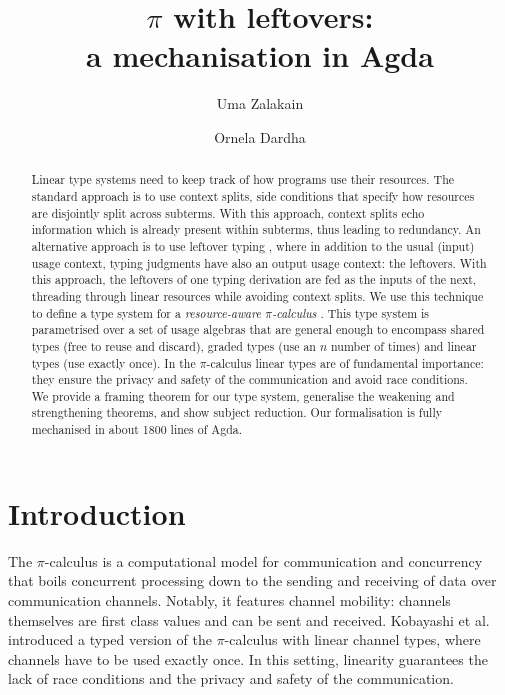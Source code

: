 \documentclass[]{llncs}
\title{$\pi$ with leftovers: \\ a mechanisation in Agda}
\author{
  Uma Zalakain\inst{1}\orcidID{0000-0002-3268-9338}
  \and
  Ornela Dardha\inst{2}\orcidID{0000-0001-9927-7875}
}
\institute{
  University of Glasgow, Scotland \\ \email{u.zalakain.1@research.gla.ac.uk}
  \and
  University of Glasgow, Scotland \\ \email{ornela.dardha@glasgow.ac.uk}
}
\newcommand{\picalc}{$\pi$-calculus}
\begin{document}
\maketitle

\begin{abstract}
  Linear type systems need to keep track of how programs use their resources.
  The standard approach is to use context splits, side conditions that specify how resources are disjointly split across subterms.
  With this approach, context splits echo information which is already present within subterms, thus leading to redundancy.  An alternative approach is to use leftover typing \cite{Mackie,Allais2018a}, where in addition to the usual (input) usage context, typing judgments have also an output usage context: the leftovers.
  With this approach, the leftovers of one typing derivation are fed as the inputs of the next, threading through linear resources while avoiding context splits.
  We use this technique to define a type system for a \emph{resource-aware \picalc{}} \cite{MilnerPW92,Milner99}.
  This type system is parametrised over a set of usage algebras that are general enough to encompass shared types (free to reuse and discard), graded types (use an $n$ number of times) and linear types (use exactly once).
  In the \picalc{} linear types are of fundamental importance: they ensure the privacy and safety of the communication and avoid race conditions.
  We provide a framing theorem for our type system, generalise the weakening and strengthening theorems, and show subject reduction.
  Our formalisation is fully mechanised in about 1800 lines of Agda.

\end{abstract}

\section{Introduction}

The \picalc{} \cite{MilnerPW92,Milner99} is a computational model for communication and concurrency that boils concurrent processing down to the sending and receiving of data over communication channels.
Notably, it features channel mobility: channels themselves are first class values and can be sent and received.
Kobayashi et al. \cite{KPT96} introduced a typed version of the \picalc{} with linear channel types, where channels have to be used exactly once.
In this setting, linearity guarantees the lack of race conditions and the privacy and safety of the communication.
\end{document}
